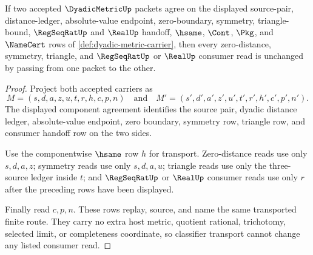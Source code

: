 \begin{theorem}
\label{thm:dyadic-metric-classifier-transport}
If two accepted $\DyadicMetricUp$ packets agree on the displayed source-pair, distance-ledger, absolute-value endpoint, zero-boundary, symmetry, triangle-bound, $\RegSeqRatUp$ and $\RealUp$ handoff, $\hsame$, $\Cont$, $\Pkg$, and $\NameCert$ rows of \autoref{def:dyadic-metric-carrier}, then every zero-distance, symmetry, triangle, and $\RegSeqRatUp$ or $\RealUp$ consumer read is unchanged by passing from one packet to the other.
\end{theorem}
\begin{proof}
Project both accepted carriers as
$$
M=(s,d,a,z,u,t,r,h,c,p,n)
\quad\text{and}\quad
M'=(s',d',a',z',u',t',r',h',c',p',n').
$$
The displayed component agreement identifies the source pair, dyadic distance ledger, absolute-value endpoint, zero boundary, symmetry row, triangle row, and consumer handoff row on the two sides.

Use the componentwise $\hsame$ row $h$ for transport. Zero-distance reads use only $s,d,a,z$; symmetry reads use only $s,d,a,u$; triangle reads use only the three-source ledger inside $t$; and $\RegSeqRatUp$ or $\RealUp$ consumer reads use only $r$ after the preceding rows have been displayed.

Finally read $c,p,n$. These rows replay, source, and name the same transported finite route. They carry no extra host metric, quotient rational, trichotomy, selected limit, or completeness coordinate, so classifier transport cannot change any listed consumer read.
\end{proof}


\begin{closurestatus}{\DyadicMetricUp}
  \theoryclosure{\seedClosure}
  \formalstatus{\unformalizedV}
\end{closurestatus}
